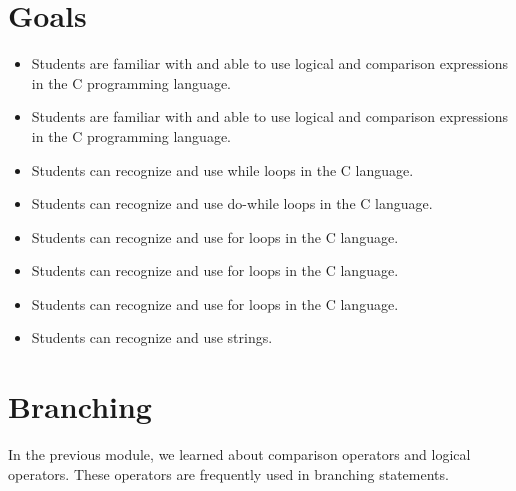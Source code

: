 \section*{Goals}
\begin{itemize}[label=$\bullet$, itemsep=-1pt, leftmargin=*]
	\item Students are familiar with and able to use logical and comparison expressions in the C programming language.
	\item Students are familiar with and able to use logical and comparison expressions in the C programming language.
	\item Students can recognize and use while loops in the C language.
	\item Students can recognize and use do-while loops in the C language.
	\item Students can recognize and use for loops in the C language.
	\item Students can recognize and use for loops in the C language.
	\item Students can recognize and use for loops in the C language.
	\item Students can recognize and use strings.
\end{itemize}

\section{Branching}

In the previous module, we learned about comparison operators and logical operators.  
These operators are frequently used in branching statements.\\

